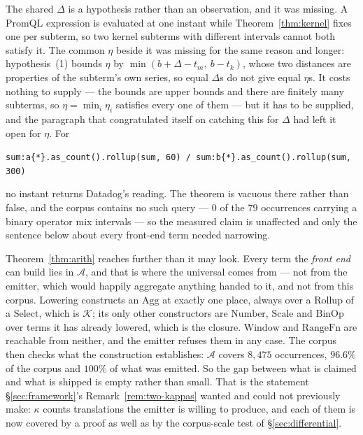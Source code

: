 \noindent
The shared $\Delta$ is a hypothesis rather than an observation, and it was missing. A
PromQL expression is evaluated at one instant while Theorem~\ref{thm:kernel} fixes one
per subterm, so two kernel subterms with different intervals cannot both satisfy it. The
common $\eta$ beside it was missing for the same reason and longer: hypothesis~(1) bounds
$\eta$ by $\min(b+\Delta-t_m,\ b-t_k)$, whose two distances are properties of the
subterm's own series, so equal $\Delta$s do not give equal $\eta$s. It costs nothing to
supply --- the bounds are upper bounds and there are finitely many subterms, so
$\eta=\min_i\eta_i$ satisfies every one of them --- but it has to be supplied, and the
paragraph that congratulated itself on catching this for $\Delta$ had left it open for
$\eta$. For
\begin{center}\footnotesize
\texttt{sum:a\{*\}.as\_count().rollup(sum, 60)\ /\ sum:b\{*\}.as\_count().rollup(sum, 300)}
\end{center}
no instant returns Datadog's reading. The theorem is vacuous there rather than false, and
the corpus contains no such query --- $0$ of the $79$ occurrences carrying a binary
operator mix intervals --- so the measured claim is unaffected and only the sentence
below about every front-end term needed narrowing.

\iffull\fi

\inlineonly{\noindent}%
Theorem~\ref{thm:arith} reaches further than it may look. Every term the \emph{front
end} can build lies in $\mathcal{A}$, and that is where the universal comes from ---
not from the emitter, which would happily aggregate anything handed to it, and not from
this corpus. Lowering constructs an $\mathrm{Agg}$ at exactly one place, always over a
$\mathrm{Rollup}$ of a $\mathrm{Select}$, which is $\mathcal{K}$; its only other
constructors are $\mathrm{Number}$, $\mathrm{Scale}$ and $\mathrm{BinOp}$ over terms it
has already lowered, which is the closure. $\mathrm{Window}$ and $\mathrm{RangeFn}$ are
reachable from neither, and the emitter refuses them in any case. The corpus then checks
what the construction establishes: $\mathcal{A}$ covers $8{,}475$ occurrences, $96.6\%$
of the corpus and $100\%$ of what was emitted. So the gap between what is claimed and
what is shipped is empty rather than small. That is the statement \S\ref{sec:framework}'s
Remark~\ref{rem:two-kappas} wanted and could not previously make: $\kappa$ counts
translations the emitter is willing to produce, and each of them is now covered by a
proof as well as by the corpus-scale test of \S\ref{sec:differential}.

\iffull\fi
